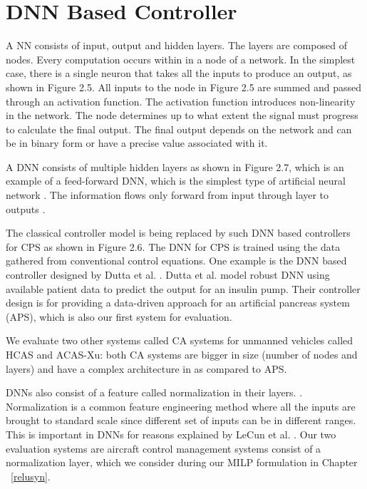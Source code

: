 \section{DNN Based Controller}
\label{apsdnn}


A \ac{NN} consists of input, output and hidden layers. 
The layers are composed of nodes. Every computation occurs within in a node of a network.
In the simplest case, there is a single neuron that takes all the inputs to produce an output, as shown in Figure 2.5. 
All inputs to the node in Figure 2.5 are summed and  passed through an activation function. 
The activation function introduces non-linearity in the network. 
The node determines up to what extent the signal must progress to calculate the final output. 
The final output depends on the network and can be in binary form or have a precise value associated with it. 


A \ac{DNN} consists of multiple hidden layers as shown in Figure 2.7, which is an example of a feed-forward \ac{DNN}, which is the simplest type of artificial neural network \cite{feedforward}.
The information flows only forward from input through layer to outputs \cite{Zell}. 

The classical controller model is being replaced by such DNN based controllers for CPS as shown in  Figure 2.6.
The \ac{DNN} for \ac*{CPS} is trained using the data gathered from conventional control equations. 
One example is the DNN based controller designed by Dutta et al. \cite{Dutta_Others__2018__Robust}. 
Dutta et al. model robust DNN using available patient data to predict the output for an insulin pump.
Their controller design is for providing a data-driven approach for an artificial pancreas system (APS), which is also our first system for evaluation. 

We evaluate two other systems called \ac{CA} systems for unmanned vehicles \cite{7778055} called \ac{HCAS} and \ac{ACAS-Xu}: both \ac{CA} systems are bigger in size (number of nodes and layers) and have a complex architecture in as compared to \ac{APS}.


\ac{DNN}s also consist of a feature called normalization in their layers. . 
Normalization is a common feature engineering method where all the inputs are brought to standard scale since different set of inputs can be in different ranges. 
This is important in \ac{DNN}s for reasons explained by  LeCun et al.  \cite{10.5555/645754.668382}.
Our two evaluation systems are aircraft  control management systems \cite{10.1007/978-3-319-63387-9_5} consist of a normalization layer, 
which we consider during our \ac{MILP} formulation in Chapter ~\ref{relusyn}.

